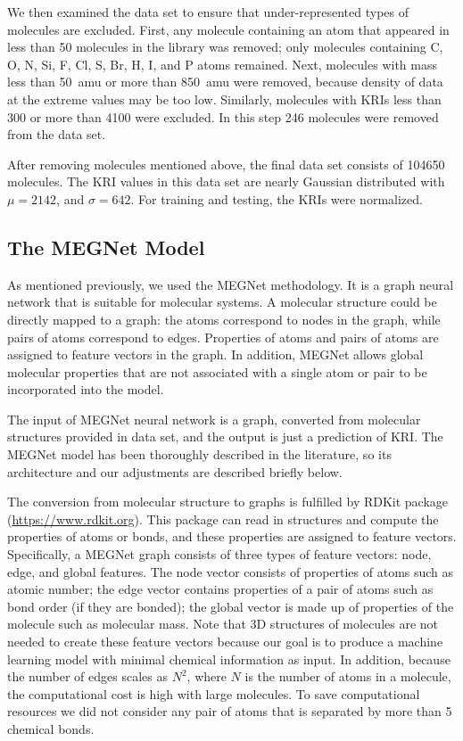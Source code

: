\documentclass{IEEEcsmag}
\begin{document}
We then examined the data set to ensure that under-represented types of molecules are excluded.
First, any molecule containing an atom that appeared in less than 50 molecules in the library was removed; only molecules containing C, O, N, Si, F, Cl, S, Br, H, I, and P atoms remained.
Next, molecules with mass less than 50~amu or more than 850~amu were removed, because density of data at the extreme values may be too low. Similarly, molecules with KRIs less than 300 or more than 4100 were excluded. In this step 246 molecules were removed from the data set.

After removing molecules mentioned above, the final data set consists of 104650 molecules. The KRI values in this data set are nearly Gaussian distributed with $\mu=2142$, and $\sigma=642$. For training and testing, the KRIs were normalized.

\subsection{The MEGNet Model}

As mentioned previously, we used the MEGNet methodology.\cite{2019Chen} It is a graph neural network that is suitable for molecular systems. A molecular structure could be directly mapped to a graph: the atoms correspond to nodes in the graph, while pairs of atoms correspond to edges. Properties of atoms and pairs of atoms are assigned to feature vectors in the graph. In addition, MEGNet allows global molecular properties that are not associated with a single atom or pair to be incorporated into the model.

The input of MEGNet neural network is a graph, converted from molecular structures provided in data set, and the output is just a prediction of KRI. The MEGNet model has been thoroughly described in the literature,\cite{2019Chen} so its architecture and our adjustments are described briefly below.

The conversion from molecular structure to graphs is fulfilled by RDKit package (\href{https://www.rdkit.org}{https://www.rdkit.org}). This package can read in structures and compute the properties of atoms or bonds, and these properties are assigned to feature vectors. Specifically, a MEGNet graph consists of three types of feature vectors: node, edge, and global features. The node vector consists of properties of atoms such as atomic number; the edge vector contains properties of a pair of atoms such as bond order (if they are bonded); the global vector is made up of properties of the molecule such as molecular mass. Note that 3D structures of molecules are not needed to create these feature vectors because our goal is to produce a machine learning model with minimal chemical information as input. In addition, because the number of edges scales as $N^2$, where $N$ is the number of atoms in a molecule, the computational cost is high with large molecules. To save computational resources we did not consider any pair of atoms that is separated by more than 5 chemical bonds.
\end{document}
